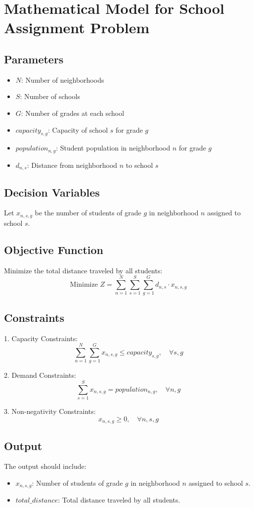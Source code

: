 \documentclass{article}
\begin{document}
\section*{Mathematical Model for School Assignment Problem}

\subsection*{Parameters}
\begin{itemize}
    \item \( N \): Number of neighborhoods
    \item \( S \): Number of schools
    \item \( G \): Number of grades at each school
    \item \( capacity_{s,g} \): Capacity of school \( s \) for grade \( g \)
    \item \( population_{n,g} \): Student population in neighborhood \( n \) for grade \( g \)
    \item \( d_{n,s} \): Distance from neighborhood \( n \) to school \( s \)
\end{itemize}

\subsection*{Decision Variables}
Let \( x_{n,s,g} \) be the number of students of grade \( g \) in neighborhood \( n \) assigned to school \( s \).

\subsection*{Objective Function}
Minimize the total distance traveled by all students:
\[
\text{Minimize } Z = \sum_{n=1}^{N} \sum_{s=1}^{S} \sum_{g=1}^{G} d_{n,s} \cdot x_{n,s,g}
\]

\subsection*{Constraints}
1. Capacity Constraints:
\[
\sum_{n=1}^{N} \sum_{g=1}^{G} x_{n,s,g} \leq capacity_{s,g}, \quad \forall s, g
\]

2. Demand Constraints:
\[
\sum_{s=1}^{S} x_{n,s,g} = population_{n,g}, \quad \forall n, g
\]

3. Non-negativity Constraints:
\[
x_{n,s,g} \geq 0, \quad \forall n, s, g
\]

\subsection*{Output}
The output should include:
\begin{itemize}
    \item \( x_{n,s,g} \): Number of students of grade \( g \) in neighborhood \( n \) assigned to school \( s \).
    \item \( total\_distance \): Total distance traveled by all students.
\end{itemize}
\end{document}
